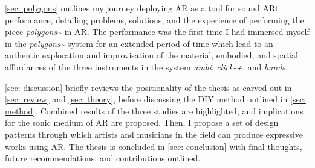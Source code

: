 \autoref{sec: polygons} outlines my journey deploying AR as a tool for sound ARt performance, detailing problems, solutions, and the experience of performing the piece \textit{polygons\textasciitilde{}} in AR. The performance was the first time I had immersed myself in the \textit{polygons\textasciitilde{}} system for an extended period of time which lead to an authentic exploration and improvisation of the material, embodied, and spatial affordances of the three instruments in the system \textit{ambi}, \textit{click-+}, and \textit{hands}.

\autoref{sec: discussion} briefly reviews the positionality of the thesis as carved out in \autoref{sec: review} and \autoref{sec: theory}, before discussing the DIY method outlined in \autoref{sec: method}. Combined results of the three studies are highlighted, and implications for the sonic medium of AR are proposed. Then, I propose a set of design patterns through which artists and musicians in the field can produce expressive works using AR. The thesis is concluded in \autoref{sec: conclusion} with final thoughts, future recommendations, and contributions outlined.
